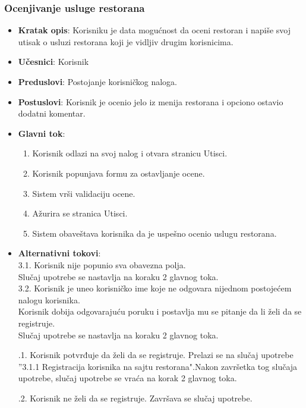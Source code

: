 \subsubsection{Ocenjivanje usluge restorana}
\begin{itemize}
    \item \textbf{Kratak opis}:
    Korisniku je data mogućnost da oceni restoran i napiše svoj utisak o usluzi restorana koji je vidljiv drugim korisnicima.
    \item \textbf{Učesnici}:
    Korisnik
    \item \textbf{Preduslovi}:
    Postojanje korisničkog naloga. 
    \item \textbf{Postuslovi}:
    Korisnik je ocenio jelo iz menija restorana i opciono ostavio dodatni komentar.
    \item \textbf{Glavni tok}:
   \begin{enumerate}
        \item Korisnik odlazi na svoj nalog i otvara stranicu Utisci.
        \item Korisnik popunjava formu za ostavljanje ocene.
        \item Sistem vrši validaciju ocene.
        \item Ažurira se stranica Utisci.
        \item Sistem obaveštava korisnika da je uspešno ocenio uslugu restorana.
    \end{enumerate}
\end{itemize}
\begin{itemize}
\item \textbf {Alternativni tokovi}:\\ 
 3.1. Korisnik nije popunio sva obavezna polja.\\
 Slučaj upotrebe se nastavlja na koraku 2 glavnog toka.\\
 3.2. Korisnik je uneo korisničko ime koje ne odgovara nijednom postojećem nalogu korisnika. \\
 Korisnik dobija odgovarajuću poruku i postavlja mu se pitanje da li želi da se registruje. \\
 Slučaj upotrebe se nastavlja na koraku 2 glavnog toka.
 
.1. Korisnik potvrđuje da želi da se registruje.
Prelazi se na slučaj upotrebe ”3.1.1 Registracija korisnika na sajtu restorana".Nakon završetka tog slučaja upotrebe, slučaj upotrebe se vraća na korak 2 glavnog toka. 

.2. Korisnik ne želi da se registruje. Završava se slučaj upotrebe.
\end{itemize}


